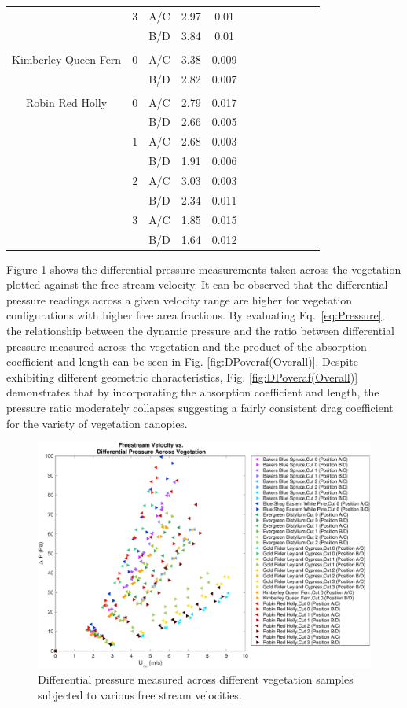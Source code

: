 \documentclass[12pt]{article}
\begin{document}
\begin{table}
\begin{tabular}{cccccccccccc}
	&	3	& 	A/C	&	2.97	&	0.01	&	\\	
	&		& 	B/D	&	3.84	&	0.01	&	\\	
			& 		&		&		&	\\	
Kimberley Queen Fern	&	0	& 	A/C	&	3.38	&	0.009	&	\\	
	&		& 	B/D	&	2.82	&	0.007	&	\\	
	&		&		&		&		&	\\		
Robin Red Holly	&	0	&	A/C	&	2.79	&	0.017	&	\\	
	&		&	B/D	&	2.66	&	0.005	&	\\	
	&	1	& 	A/C	&	2.68	&	0.003	&	\\	
	&		& 	B/D	&	1.91	&	0.006	&	\\	
	&	2	& 	A/C	&	3.03	&	0.003	&	\\	
	&		& 	B/D	&	2.34	&	0.011	&	\\	
	&	3	& 	A/C	&	1.85	&	0.015	&	\\	
	&		& 	B/D	&	1.64	&	0.012	&	\\	

		\hline
	\end{tabular}

\end{table}

\indent Figure \ref{fig:DPvU(Overall)} shows the differential pressure measurements taken across the vegetation plotted against the free stream velocity. It can be observed that the differential pressure readings across a given velocity range are higher for vegetation configurations with higher free area fractions. By evaluating Eq.~\ref{eq:Pressure}, the relationship between the dynamic pressure and the ratio between differential pressure measured across the vegetation and the product of the absorption coefficient and length can be seen in Fig. \ref{fig:DPoveraf(Overall)}. Despite exhibiting different geometric characteristics, Fig. \ref{fig:DPoveraf(Overall)} demonstrates that by incorporating the absorption coefficient and length, the pressure ratio moderately collapses suggesting a fairly consistent drag coefficient for the variety of vegetation canopies.


\begin{figure} [h]
	\centering 	\includegraphics[width=0.8\linewidth]{DPvU(Overall_Ave).pdf}
	\caption{Differential pressure measured across different vegetation samples subjected to various free stream velocities.}
	\label{fig:DPvU(Overall)}
\end{figure}
\end{document}
